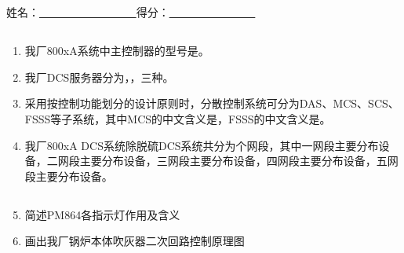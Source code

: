 \documentclass{book}
\begin{document}
		\else						%
		\fi						%
\chapter[2023年11月份技术培训考试]{	\hspace*{-0.3em}}
姓名：\uline{ \ \  \  \ \ \ \ \ \ \ \ \ \ \ \ \ \ }\hfill 得分：\uline{ \ \  \  \ \ \ \ \ \  \ \ \ \ \ \ }
\section{}
\begin{enumerate}
	\setcounter{enumi}{0}
	\item 我厂800xA系统中主控制器的型号是。
	\item 我厂DCS服务器分为，，三种。
	\item 采用按控制功能划分的设计原则时，分散控制系统可分为DAS、MCS、SCS、FSSS等子系统，其中MCS的中文含义是，FSSS的中文含义是。
	\item 我厂800xA DCS系统除脱硫DCS系统共分为个网段，其中一网段主要分布设备，二网段主要分布设备，三网段主要分布设备，四网段主要分布设备，五网段主要分布设备。
\end{enumerate}
\section{}
\begin{enumerate}
	\setcounter{enumi}{4}
	\item 简述PM864各指示灯作用及含义
	\item 画出我厂锅炉本体吹灰器二次回路控制原理图
\end{enumerate}
\end{document}
